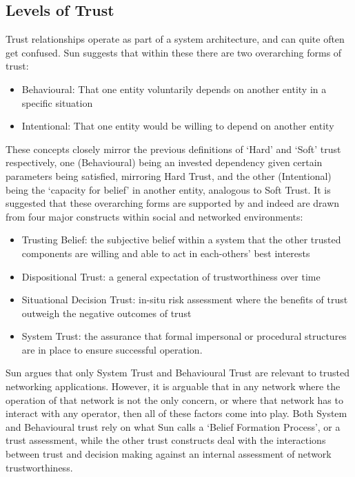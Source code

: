 \subsection{Levels of Trust}
Trust relationships operate as part of a system architecture, and can quite often get confused.
Sun\cite{Sun2008} suggests that within these there are two overarching forms of trust:
\begin{itemize}
  \item Behavioural: That one entity voluntarily depends on another entity in a specific situation
  \item Intentional: That one entity would be willing to depend on another entity
\end{itemize}
These concepts closely mirror the previous definitions of ‘Hard’ and ‘Soft’ trust respectively, one (Behavioural) being an invested dependency given certain parameters being satisfied, mirroring Hard Trust, and the other (Intentional) being the ‘capacity for belief’ in another entity, analogous to Soft Trust.
It is suggested that these overarching forms are supported by and indeed are drawn from four major constructs within social and networked environments:
\begin{itemize}
  \item Trusting Belief: the subjective belief within a system that the other trusted components are willing and able to act in each-others’ best interests
  \item Dispositional Trust: a general expectation of trustworthiness over time 
  \item Situational Decision Trust: in-situ risk assessment where the benefits of trust outweigh the negative outcomes of trust
  \item System Trust: the assurance that formal impersonal or procedural structures are in place to ensure successful operation.
\end{itemize}
Sun argues that only System Trust and Behavioural Trust are relevant to trusted networking applications.
However, it is arguable that in any network where the operation of that network is not the only concern, or where that network has to interact with any operator, then all of these factors come into play.
Both System and Behavioural trust rely on what Sun calls a ‘Belief Formation Process’, or a trust assessment, while the other trust constructs deal with the interactions between trust and decision making against an internal assessment of network trustworthiness.


